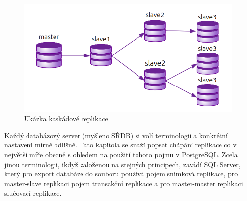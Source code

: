           \begin{figure}[H]
            \centering
            \includegraphics[scale=1]{../../../grafy/obr/schema_kaskadova.png}
            \caption{Ukázka kaskádové replikace}
            \label{kaskadova}
          \end{figure}

Každý databázový server (myšleno SŘDB) si volí terminologii a konkrétní nastavení mírně odlišně. Tato kapitola se snaží popsat chápání replikace co v největší míře obecně s ohledem na použití tohoto pojmu v PostgreSQL. Zcela jinou terminologii, ikdyž založenou na stejných principech, zavádí SQL Server, který pro export databáze do souboru používá pojem snímková replikace, pro master-slave replikaci pojem transakční replikace a pro master-master replikaci slučovací replikace. 



